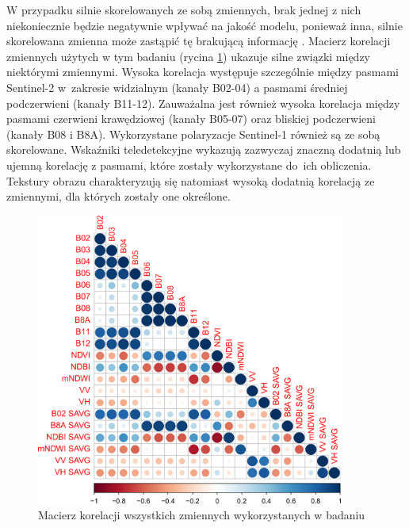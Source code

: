 \documentclass{amuthesis}
\begin{document}
W przypadku silnie skorelowanych ze sobą zmiennych, brak jednej z nich
niekoniecznie będzie negatywnie wpływać na jakość modelu, ponieważ inna,
silnie skorelowana zmienna może zastąpić tę brakującą informację
\autocite{biecek_2021_model_analysis}. Macierz korelacji zmiennych
użytych w tym badaniu (rycina \ref{fig-variables-correlation}) ukazuje
silne związki między niektórymi zmiennymi. Wysoka korelacja występuje
szczególnie między pasmami Sentinel-2 w~zakresie widzialnym (kanały
B02-04) a pasmami średniej podczerwieni (kanały B11-12). Zauważalna jest
również wysoka korelacja między pasmami czerwieni krawędziowej (kanały
B05-07) oraz bliskiej podczerwieni (kanały B08 i B8A). Wykorzystane
polaryzacje Sentinel-1 również są ze sobą skorelowane. Wskaźniki
teledetekcyjne wykazują zazwyczaj znaczną dodatnią lub ujemną korelację
z pasmami, które zostały wykorzystane do~ich obliczenia. Tekstury obrazu
charakteryzują się natomiast wysoką dodatnią korelacją ze zmiennymi, dla
których zostały one określone.

\begin{figure}[t]

{\centering \includegraphics[width=0.9\textwidth,height=\textheight]{figures/corrplot1.png}

}

\caption{\label{fig-variables-correlation}Macierz korelacji wszystkich
zmiennych wykorzystanych w badaniu}

\end{figure}
\end{document}
